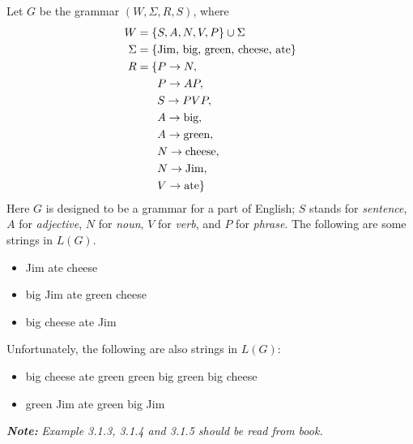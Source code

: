 \begin{example_break}{}
  Let $G$ be the grammar $(W, \Sigma, R, S)$, where
  \begin{align*}
    W = \{& S, A, N, V, P \} \cup \Sigma\\
    \Sigma = \{& \textnormal{Jim, big, green, cheese, ate} \}\\
    R = \{& P \to N,\\
          & P \to AP,\\
          & S \to PVP,\\
          & A \to \textnormal{big},\\
          & A \to \textnormal{green},\\
          & N \to \textnormal{cheese},\\
          & N \to \textnormal{Jim},\\
          & V \to \textnormal{ate} \}
  \end{align*}
  Here $G$ is designed to be a grammar for a part of English; $S$ stands for \textit{sentence}, $A$ for \textit{adjective}, $N$ for \textit{noun}, $V$ for \textit{verb}, and $P$ for \textit{phrase}. The following are some strings in $L(G)$.
  \begin{itemize}
    \item Jim ate cheese
    \item big Jim ate green cheese
    \item big cheese ate Jim
  \end{itemize}
  Unfortunately, the following are also strings in $L(G)$:
  \begin{itemize}
    \item big cheese ate green green big green big cheese
    \item green Jim ate green big Jim     
  \end{itemize}
\end{example_break}

\noindent \textbf{\textit{Note:}} \textit{Example 3.1.3, 3.1.4 and 3.1.5 should be read from book.}

